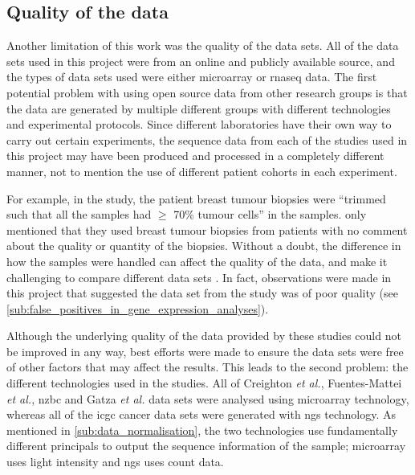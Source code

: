 \subsection{Quality of the data}
\label{sub:quality_of_the_data}

Another limitation of this work was the quality of the data sets.
All of the data sets used in this project were from an online and publicly available source, and the types of data sets used were either microarray or \gls{rnaseq} data.
The first potential problem with using open source data from other research groups is that the data are generated by multiple different groups with different technologies and experimental protocols.
Since different laboratories have their own way to carry out certain experiments, the sequence data from each of the studies used in this project may have been produced and processed in a completely different manner, not to mention the use of different patient cohorts in each experiment.

For example, in the \citet{Creighton2012} study, the patient breast tumour biopsies were ``trimmed such that all the samples had $\geq$ 70\% tumour cells'' in the samples.
\citet{Fuentes-Mattei2014} only mentioned that they used breast tumour biopsies from patients with no comment about the quality or quantity of the biopsies.
Without a doubt, the difference in how the samples were handled can affect the quality of the data, and make it challenging to compare different data sets \citep{Irizarry2005}.
In fact, observations were made in this project that suggested the data set from the \citet{Creighton2012} study was of poor quality (see \cref{sub:false_positives_in_gene_expression_analyses}).

Although the underlying quality of the data provided by these studies could not be improved in any way, best efforts were made to  ensure the data sets were free of other factors that may affect the results.
This leads to the second problem: the different technologies used in the studies.
All of Creighton \textit{et al.}, Fuentes-Mattei \textit{et al.}, \gls{nzbc} and Gatza \textit{et al.} data sets were analysed using microarray technology, whereas all of the \gls{icgc} cancer data sets were generated with \gls{ngs} technology.
As mentioned in \cref{sub:data_normalisation}, the two technologies use fundamentally different principals to output the sequence information of the sample; microarray uses light intensity and \gls{ngs} uses count data.

